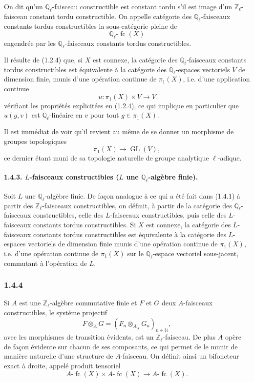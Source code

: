 \documentclass[11pt]{article}
\providecommand{\GL}{\operatorname{GL}}
\providecommand{\fc}{\operatorname{fc}}
\begin{document}
On dit qu'un \(\mathbb Q_\ell\)-faisceau constructible est constant tordu s'il est image d'un \(\mathbb Z_\ell\)-faisceau constant tordu constructible. On appelle catégorie des \(\mathbb Q_\ell\)-faisceaux constants tordus constructibles la sous-catégorie pleine de
\[
\mathbb Q_\ell\text{-}\fc(X)
\]
engendrée par les \(\mathbb Q_\ell\)-faisceaux constants tordus constructibles.

Il résulte de (1.2.4) que, si \(X\) est connexe, la catégorie des \(\mathbb Q_\ell\)-faisceaux constants tordus constructibles est équivalente à la catégorie des \(\mathbb Q_\ell\)-espaces vectoriels \(V\) de dimension finie, munis d'une opération continue de \(\pi_1(X)\), i.e. d'une application continue
\[
u:\pi_1(X)\times V\longrightarrow V
\]
vérifiant les propriétés explicitées en (1.2.4), ce qui implique en particulier que \(u(g,v)\) est \(\mathbb Q_\ell\)-linéaire en \(v\) pour tout \(g\in\pi_1(X)\).

Il est immédiat de voir qu'il revient au même de se donner un morphisme de groupes topologiques
\[
\pi_1(X)\longrightarrow \GL(V),
\]
ce dernier étant muni de sa topologie naturelle de groupe analytique \(\ell\)-adique.

\paragraph{1.4.3. \(L\)-faisceaux constructibles (\(L\) une \(\mathbb Q_\ell\)-algèbre finie).}
Soit \(L\) une \(\mathbb Q_\ell\)-algèbre finie. De façon analogue à ce qui a été fait dans (1.4.1) à partir des \(\mathbb Z_\ell\)-faisceaux constructibles, on définit, à partir de la catégorie des \(\mathbb Q_\ell\)-faisceaux constructibles, celle des \(L\)-faisceaux constructibles, puis celle des \(L\)-faisceaux constants tordus constructibles. Si \(X\) est connexe, la catégorie des \(L\)-faisceaux constants tordus constructibles est équivalente à la catégorie des \(L\)-espaces vectoriels de dimension finie munis d'une opération continue de \(\pi_1(X)\), i.e. d'une opération continue de \(\pi_1(X)\) sur le \(\mathbb Q_\ell\)-espace vectoriel sous-jacent, commutant à l'opération de \(L\).

\subsubsection*{1.4.4}
Si \(A\) est une \(\mathbb Z_\ell\)-algèbre commutative finie et \(F\) et \(G\) deux \(A\)-faisceaux constructibles, le système projectif
\[
F\otimes_A G=(F_n\otimes_{A_X} G_n)_{n\in\mathbb N},
\]
avec les morphismes de transition évidents, est un \(\mathbb Z_\ell\)-faisceau. De plus \(A\) opère de façon évidente sur chacun de ses composants, ce qui permet de le munir de manière naturelle d'une structure de \(A\)-faisceau. On définit ainsi un bifoncteur exact à droite, appelé produit tensoriel
\[
A\text{-}\fc(X)\times A\text{-}\fc(X)\longrightarrow A\text{-}\fc(X).
\]
\end{document}
